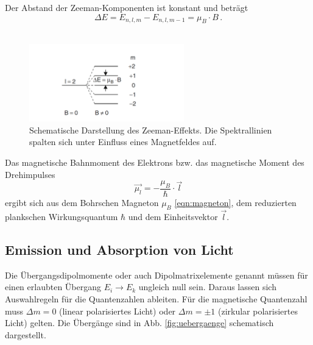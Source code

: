 Der Abstand der Zeeman-Komponenten ist konstant und beträgt
\begin{equation}
    \Delta E = E_{n,l,m} - E_{n,l,m-1} = \mu_B \cdot B \, .
    \label{eqn:energie_dif_normal}
\end{equation}
\\
\begin{figure}
    \centering
    \includegraphics[width=0.6\textwidth]{content/data/zeeman_aufspaltung.png}
    \caption{Schematische Darstellung des Zeeman-Effekts. Die Spektrallinien spalten sich unter Einfluss eines Magnetfeldes auf. \cite[150]{demtroeder}} %
    \label{fig:zeeman_aufspaltung}
\end{figure}

Das magnetische Bahnmoment des Elektrons bzw. das magnetische Moment des Drehimpulses
\begin{equation}
    \vec{\mu_l} = -\frac{\mu_B}{\hbar} \cdot \vec{l}
    \label{eqn:magn_moment_l}
\end{equation}
ergibt sich aus dem Bohrschen Magneton $\mu_B$ \eqref{eqn:magneton}, dem reduzierten plankschen Wirkungsquantum $\hbar$ und dem Einheitsvektor $\vec{l}$.
 
\subsection{Emission und Absorption von Licht}
Die Übergangsdipolmomente oder auch Dipolmatrixelemente genannt müssen für einen erlaubten Übergang $E_i \rightarrow E_k$ ungleich null sein.
Daraus lassen sich Auswahlregeln für die Quantenzahlen ableiten.
Für die magnetische Quantenzahl muss $\Delta m = 0$ (linear polarisiertes Licht) oder $\Delta m = \pm 1$ (zirkular polarisiertes Licht) gelten.
Die Übergänge sind in Abb. \ref{fig:uebergaenge} schematisch dargestellt.

